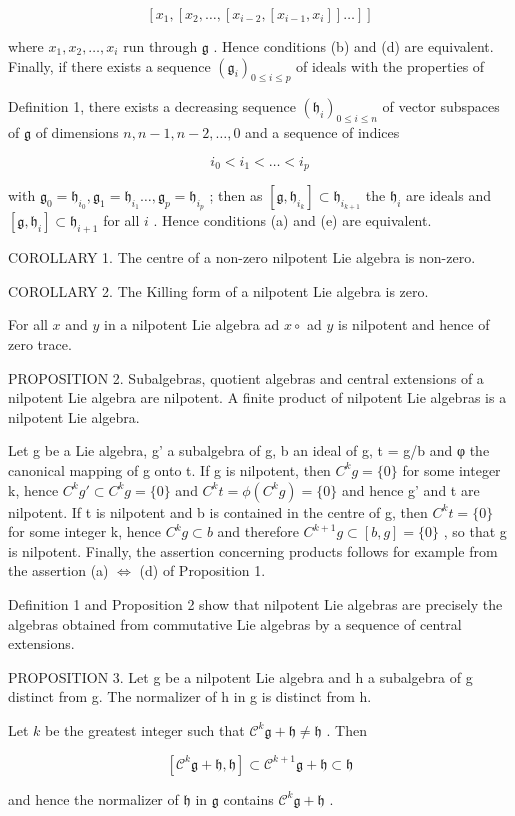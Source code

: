 \[
\left[ x _ {1}, \left[ x _ {2}, \dots , \left[ x _ {i - 2}, \left[ x _ {i - 1}, x _ {i} \right] \right] \dots \right] \right]
\]

where \(x_{1}, x_{2}, \ldots, x_{i}\) run through \(\mathfrak{g}\) . Hence conditions (b) and (d) are equivalent. Finally, if there exists a sequence \((\mathfrak{g}_i)_{0 \leqslant i \leqslant p}\) of ideals with the properties of

Definition 1, there exists a decreasing sequence \((\mathfrak{h}_i)_{0\leqslant i\leqslant n}\) of vector subspaces of \(\mathfrak{g}\) of dimensions \(n,n - 1,n - 2,\ldots ,0\) and a sequence of indices

\[
i _ {0} <   i _ {1} <   \dots <   i _ {p}
\]

with \(\mathfrak{g}_0 = \mathfrak{h}_{i_0},\mathfrak{g}_1 = \mathfrak{h}_{i_1}\dots ,\mathfrak{g}_p = \mathfrak{h}_{i_p}\) ; then as \([\mathfrak{g},\mathfrak{h}_{i_k}]\subset \mathfrak{h}_{i_{k + 1}}\) the \(\mathfrak{h}_i\) are ideals and \([\mathfrak{g},\mathfrak{h}_i]\subset \mathfrak{h}_{i + 1}\) for all \(i\) . Hence conditions (a) and (e) are equivalent.

COROLLARY 1. The centre of a non-zero nilpotent Lie algebra is non-zero.

COROLLARY 2. The Killing form of a nilpotent Lie algebra is zero.

For all \(x\) and \(y\) in a nilpotent Lie algebra ad \(x \circ\) ad \(y\) is nilpotent and hence of zero trace.

PROPOSITION 2. Subalgebras, quotient algebras and central extensions of a nilpotent Lie algebra are nilpotent. A finite product of nilpotent Lie algebras is a nilpotent Lie algebra.

Let g be a Lie algebra, g' a subalgebra of g, b an ideal of g, t = g/b and φ the canonical mapping of g onto t. If g is nilpotent, then \(C^{k}g = \{0\}\) for some integer k, hence \(C^{k}g' \subset C^{k}g = \{0\}\) and \(C^{k}t = \phi(C^{k}g) = \{0\}\) and hence g' and t are nilpotent. If t is nilpotent and b is contained in the centre of g, then \(C^{k}t = \{0\}\) for some integer k, hence \(C^{k}g \subset b\) and therefore \(C^{k+1}g \subset [b, g] = \{0\}\) , so that g is nilpotent. Finally, the assertion concerning products follows for example from the assertion (a) \(\Leftrightarrow\) (d) of Proposition 1.

Definition 1 and Proposition 2 show that nilpotent Lie algebras are precisely the algebras obtained from commutative Lie algebras by a sequence of central extensions.

PROPOSITION 3. Let g be a nilpotent Lie algebra and h a subalgebra of g distinct from g. The normalizer of h in g is distinct from h.

Let \(k\) be the greatest integer such that \(\mathcal{C}^k\mathfrak{g} + \mathfrak{h}\neq \mathfrak{h}\) . Then

\[
[ \mathcal {C} ^ {k} \mathfrak {g} + \mathfrak {h}, \mathfrak {h} ] \subset \mathcal {C} ^ {k + 1} \mathfrak {g} + \mathfrak {h} \subset \mathfrak {h}
\]

and hence the normalizer of \(\mathfrak{h}\) in \(\mathfrak{g}\) contains \(\mathcal{C}^k\mathfrak{g} + \mathfrak{h}\) .

